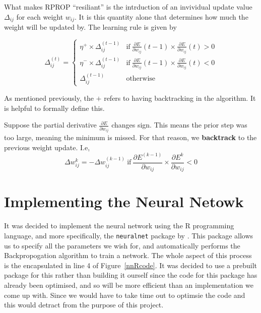 What makes RPROP ``resiliant'' is the intrduction of an invividual update value $\Delta_{ij}$ for each weight $w_{ij}$. It is this quantity alone that determines 
how much the weight will be updated by. The learning rule is given by 

\begin{equation}
    \Delta_{ij}^{(t)} = 
    \begin{cases}
        \eta^{+}\times \Delta_{ij}^{(t-1)} & \text{if} \  \frac{\partial E}{\partial w_{ij}}(t-1)\times\frac{\partial E}{\partial w_{ij}}(t) > 0 \\
        \eta^{-}\times \Delta_{ij}^{(t-1)} & \text{if} \  \frac{\partial E}{\partial w_{ij}}(t-1)\times\frac{\partial E}{\partial w_{ij}}(t) < 0 \\
        \Delta_{ij}^{(t-1)} & \text{otherwise}
    \end{cases}
\end{equation}

As mentioned previously, the $+$ refers to having backtracking in the algorithm. It is helpful to formally define this.

\begin{definition}
    Suppose the partial derivative $\frac{\partial E}{\partial w_{ij}}$ changes sign. This means the prior step was too large, meaning the minimum is missed. For that reason, 
    we \textbf{backtrack} to the previous weight update. I.e,
    \[
        \Delta w_{ij}^k = -\Delta w_{ij}^{(k-1)} \  \text{if} \  \frac{\partial E^{(k-1)}}{\partial w_{ij}} \times \frac{\partial E^k}{\partial w_{ij}} < 0 
    \]
\end{definition}

\section{Implementing the Neural Netowk}
It was decided to implement the neural network using the R programming language, and more specifically, the \verb|neuralnet| package by \cite{gunther}. This package 
allows us to specify all the parameters we wish for, and automatically performs the Backpropogation algorithm to train a network. The whole aspect of this process is the encapsulated in line 4
of Figure~\ref{nnRcode}. It was decided to use a prebuilt package for this rather than building it ourself since the code for this package has already been optimised, and so will be more efficient 
than an implementation we come up with. Since we would have to take time out to optimsie the code and this would detract from the purpose of this project. \\  

